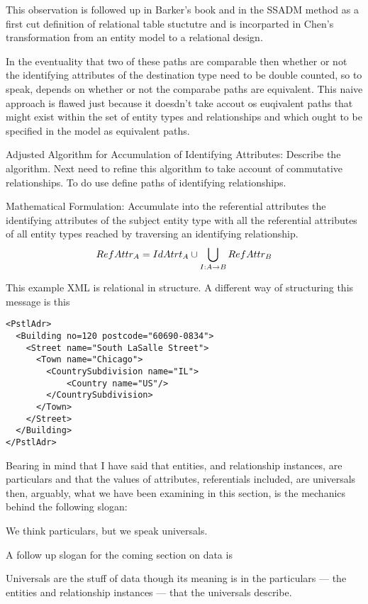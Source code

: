 This observation is followed up in Barker's book and in the SSADM method as a first cut definition of relational table stuctutre and is incorparted in Chen's transformation from an entity model to a relational design.

In the eventuality that two of these paths are comparable then whether or not the identifying attributes of the destination type need to be double counted, so to speak,
depends on whether or not the comparabe paths are equivalent.
\mynote
This naive approach is flawed just because it doesdn't take accout os euqivalent paths that might exist within the set of entity types and relationships and which ought to be specified in the model as equivalent paths.

\mynote 
Adjusted Algorithm for Accumulation of Identifying Attributes:
Describe the algorithm.
Next need to refine this algorithm to take account of commutative relationships. 
To do use define paths of identifying relationships.

\mynote
Mathematical Formulation:
Accumulate into the referential attributes the identifying attributes of the subject entity type
with all the referential attributes of all entity types reached by traversing an identifying relationship.
$$RefAttr_A=IdAtrt_A \cup \bigcup_{I:A \rightarrow B}RefAttr_B$$

\mynote
This example XML is relational in structure. A different way of structuring this message
is this
\begin{verbatim}
<PstlAdr>
  <Building no=120 postcode="60690-0834">
    <Street name="South LaSalle Street">
      <Town name="Chicago">
        <CountrySubdivision name="IL">
            <Country name="US"/>
        </CountrySubdivision>
      </Town>
    </Street>
  </Building>
</PstlAdr>
\end{verbatim}

\mynote
Bearing in mind that I have said that entities, and relationship instances, are particulars
and that the values of attributes, referentials included, are universals then, arguably,
 what we have been examining in this section, 
 is the mechanics behind the following slogan:
\begin{erquote}
We think particulars, but we speak universals.
\end{erquote}
\begin{noteforfuture}
\mynote
A follow up slogan for the coming section on data is
\begin{erquote}
Universals are the stuff of data though its meaning is in the 
particulars --- the entities and relationship instances --- that the universals describe. 
\end{erquote}
\end{noteforfuture}

